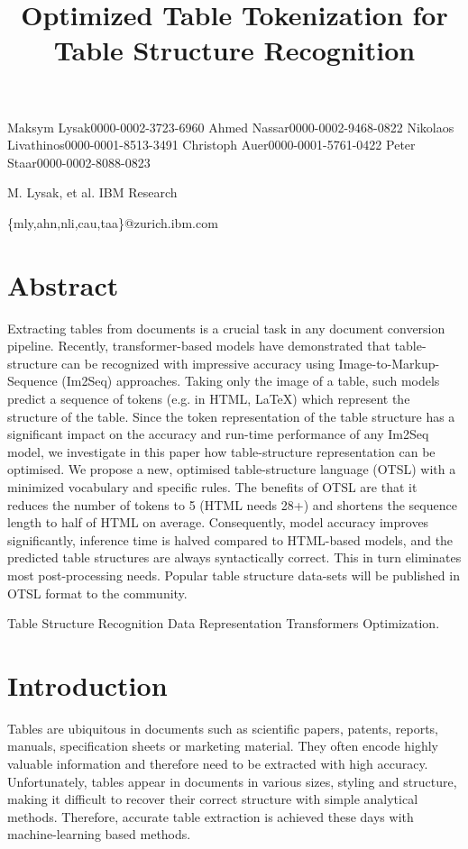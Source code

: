 \documentclass[11pt,a4paper]{article}
\title{Optimized Table Tokenization for Table Structure Recognition}
\begin{document}
\maketitle

Maksym Lysak0000-0002-3723-6960 Ahmed Nassar0000-0002-9468-0822 Nikolaos Livathinos0000-0001-8513-3491 Christoph Auer0000-0001-5761-0422 Peter Staar0000-0002-8088-0823

M. Lysak, et al.
IBM Research

\{mly,ahn,nli,cau,taa\}@zurich.ibm.com

\section{Abstract}

Extracting tables from documents is a crucial task in any document conversion pipeline. Recently, transformer-based models have demonstrated that table-structure can be recognized with impressive accuracy using Image-to-Markup-Sequence (Im2Seq) approaches. Taking only the image of a table, such models predict a sequence of tokens (e.g. in HTML, LaTeX) which represent the structure of the table. Since the token representation of the table structure has a significant impact on the accuracy and run-time performance of any Im2Seq model, we investigate in this paper how table-structure representation can be optimised. We propose a new, optimised table-structure language (OTSL) with a minimized vocabulary and specific rules. The benefits of OTSL are that it reduces the number of tokens to 5 (HTML needs 28+) and shortens the sequence length to half of HTML on average. Consequently, model accuracy improves significantly, inference time is halved compared to HTML-based models, and the predicted table structures are always syntactically correct. This in turn eliminates most post-processing needs. Popular table structure data-sets will be published in OTSL format to the community.

Table Structure Recognition Data Representation Transformers Optimization.

\section{Introduction}

Tables are ubiquitous in documents such as scientific papers, patents, reports, manuals, specification sheets or marketing material. They often encode highly valuable information and therefore need to be extracted with high accuracy. Unfortunately, tables appear in documents in various sizes, styling and structure, making it difficult to recover their correct structure with simple analytical methods. Therefore, accurate table extraction is achieved these days with machine-learning based methods.
\end{document}
